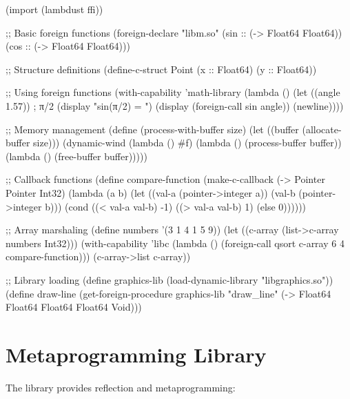 \begin{example} 
\begin{lambdustcode}
(import (lambdust ffi))

;; Basic foreign functions
(foreign-declare "libm.so"
  (sin :: (-> Float64 Float64))
  (cos :: (-> Float64 Float64)))

;; Structure definitions
(define-c-struct Point
  (x :: Float64)
  (y :: Float64))

;; Using foreign functions
(with-capability 'math-library
  (lambda ()
    (let ((angle 1.57))  ; π/2
      (display "sin(π/2) = ") 
      (display (foreign-call sin angle))
      (newline))))

;; Memory management
(define (process-with-buffer size)
  (let ((buffer (allocate-buffer size)))
    (dynamic-wind
      (lambda () #f)
      (lambda () (process-buffer buffer))
      (lambda () (free-buffer buffer)))))

;; Callback functions
(define compare-function
  (make-c-callback (-> Pointer Pointer Int32)
    (lambda (a b)
      (let ((val-a (pointer->integer a))
            (val-b (pointer->integer b)))
        (cond ((< val-a val-b) -1)
              ((> val-a val-b) 1)
              (else 0))))))

;; Array marshaling
(define numbers '(3 1 4 1 5 9))
(let ((c-array (list->c-array numbers Int32)))
  (with-capability 'libc
    (lambda ()
      (foreign-call qsort c-array 6 4 compare-function)))
  (c-array->list c-array))

;; Library loading
(define graphics-lib (load-dynamic-library "libgraphics.so"))
(define draw-line (get-foreign-procedure graphics-lib "draw_line"
                    (-> Float64 Float64 Float64 Float64 Void)))
\end{lambdustcode}
\end{example}

\section{Metaprogramming Library}
\label{sec:meta-library}


The  library provides reflection and metaprogramming:

